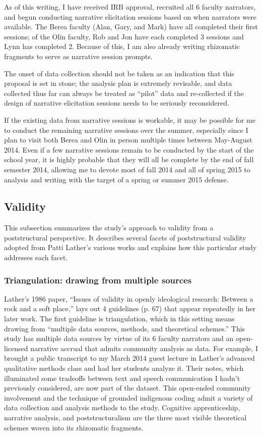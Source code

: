 As of this writing, I have received IRB approval, recruited all 6 faculty narrators, and begun conducting narrative elicitation sessions based on when narrators were available. The Berea faculty (Alan, Gary, and Mark) have all completed their first sessions; of the Olin faculty, Rob and Jon have each completed 3 sessions and Lynn has completed 2. Because of this, I am also already writing rhizomatic fragments to serve as narrative session prompts.

The onset of data collection should not be taken as an indication that this proposal is set in stone; the analysis plan is extremely revisable, and data collected thus far can always be treated as “pilot” data and re-collected if the design of narrative elicitation sessions needs to be seriously reconsidered.

If the existing data from narrative sessions is workable, it may be possible for me to conduct the remaining narrative sessions over the summer, especially since I plan to visit both Berea and Olin in person multiple times between May-August 2014. Even if a few narrative sessions remain to be conducted by the start of the school year, it is highly probable that they will all be complete by the end of fall semester 2014, allowing me to devote most of fall 2014 and all of spring 2015 to analysis and writing with the target of a spring or summer 2015 defense.

\subsection{Validity}

This subsection summarizes the study’s approach to validity from a poststructural perspective. It describes several facets of poststructural validity adopted from Patti Lather’s various works and explains how this particular study addresses each facet.

\subsubsection{Triangulation: drawing from multiple sources}

Lather’s 1986 paper, “Issues of validity in openly ideological research: Between a rock and a soft place,” lays out 4 guidelines (p. 67) that appear repeatedly in her later work. The first guideline is triangulation, which in this setting means drawing from “multiple data sources, methods, and theoretical schemes.” This study has multiple data sources by virtue of its 6 faculty narrators and an open-licensed narrative accrual that admits community analysis as data. For example, I brought a public transcript to my March 2014 guest lecture in Lather’s advanced qualitative methods class and had her students analyze it. Their notes, which illuminated some tradeoffs between text and speech communication I hadn’t previously considered, are now part of the dataset. This open-ended community involvement and the technique of grounded indigenous coding admit a variety of data collection and analysis methods to the study. Cognitive apprenticeship, narrative analysis, and poststructuralism are the three most visible theoretical schemes woven into its rhizomatic fragments.


